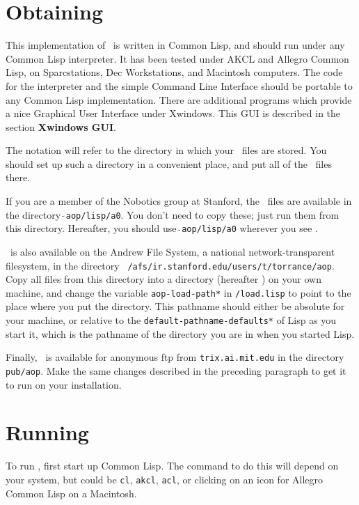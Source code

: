 \section{Obtaining \ao}

This implementation of \ao\ is written in Common Lisp, and should run
under any Common Lisp interpreter.  It has been tested under AKCL and
Allegro Common Lisp, on Sparcstations, Dec Workstations, and Macintosh
computers.  The code for the interpreter and the simple Command Line
Interface should be portable to any Common Lisp implementation.  There
are additional programs which provide a nice Graphical User Interface
under Xwindows.  This GUI is described in the section {\bf Xwindows
GUI\/}.

The notation {\tt <a0>} will refer to the directory in which your \ao\
files are stored.  You should set up such a directory in a convenient
place, and put all of the \ao\ files there.

If you are a member of the Nobotics group at Stanford, the \ao\ files
are available in the directory {\tt $\tilde{~}$aop/lisp/a0}.  You
don't need to copy these; just run them from this directory.
Hereafter, you should use {\tt $\tilde{~}$aop/lisp/a0} wherever you
see {\tt <a0>}.

\ao\ is also available on the Andrew File System, a national
network-transparent filesystem, in the directory {\tt
/afs/ir.stanford.edu/users/t/torrance/aop}.  Copy all files from this
directory into a directory (hereafter {\tt <a0>}) on your own machine,
and change the variable {\tt *aop-load-path*} in {\tt <a0>/load.lisp}
to point to the place where you put the {\tt <a0>} directory.  This
pathname should either be absolute for your machine, or relative to
the {\tt *default-pathname-defaults*} of Lisp as you start it, which
is the pathname of the directory you are in when you started Lisp.

Finally, \ao\ is available for anonymous ftp from {\tt trix.ai.mit.edu}
in the directory {\tt pub/aop}.  Make the same changes described in
the preceding paragraph to get it to run on your installation.


\section{Running \ao}

To run \ao , first start up Common Lisp.  The command to do this will
depend on your system, but could be {\tt cl}, {\tt akcl}, {\tt acl},
or clicking on an icon for Allegro Common Lisp on a Macintosh.

